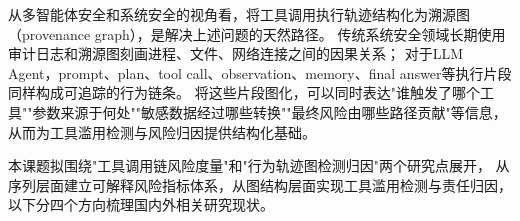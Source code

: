 从多智能体安全和系统安全的视角看，将工具调用执行轨迹结构化为溯源图（provenance graph），是解决上述问题的天然路径。
传统系统安全领域长期使用审计日志和溯源图刻画进程、文件、网络连接之间的因果关系\cite{gao2021threatraptor,cheng2024kairos,inam2023sok}；
对于LLM Agent，prompt、plan、tool call、observation、memory、final answer等执行片段同样构成可追踪的行为链条。
将这些片段图化，可以同时表达"谁触发了哪个工具""参数来源于何处""敏感数据经过哪些转换""最终风险由哪些路径贡献"等信息，
从而为工具滥用检测与风险归因提供结构化基础\cite{wang2026traces,dewitt2026openchallenges}。

本课题拟围绕"工具调用链风险度量"和"行为轨迹图检测归因"两个研究点展开，
从序列层面建立可解释风险指标体系，从图结构层面实现工具滥用检测与责任归因，
以下分四个方向梳理国内外相关研究现状。
